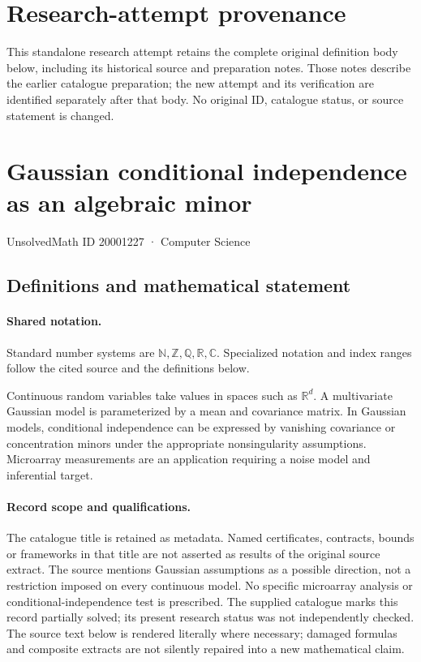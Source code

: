 \documentclass[11pt]{article}
\begin{document}
\section*{Research-attempt provenance}
This standalone research attempt retains the complete original definition body below,
including its historical source and preparation notes. Those notes describe the
earlier catalogue preparation; the new attempt and its verification are identified
separately after that body. No original ID, catalogue status, or source statement is changed.

\section{Gaussian conditional independence as an algebraic minor}\label{20001227}
{\small UnsolvedMath ID 20001227 · Computer Science}
\subsection{Definitions and mathematical statement}

\paragraph{Shared notation.}Standard number systems are $\mathbb N,\mathbb Z,\mathbb Q,\mathbb R,\mathbb C$. Specialized notation and index ranges follow the cited source and the definitions below.


Continuous random variables take values in spaces such as $\mathbb R^d$. A multivariate Gaussian model is parameterized by a mean and covariance matrix. In Gaussian models, conditional independence can be expressed by vanishing covariance or concentration minors under the appropriate nonsingularity assumptions. Microarray measurements are an application requiring a noise model and inferential target.
\paragraph{Record scope and qualifications.}
The catalogue title is retained as metadata. Named certificates, contracts, bounds or frameworks in that title are not asserted as results of the original source extract.
The source mentions Gaussian assumptions as a possible direction, not a restriction imposed on every continuous model. No specific microarray analysis or conditional-independence test is prescribed. The supplied catalogue marks this record partially solved; its present research status was not independently checked.
The source text below is rendered literally where necessary; damaged formulas and composite extracts are not silently repaired into a new mathematical claim.
\end{document}
